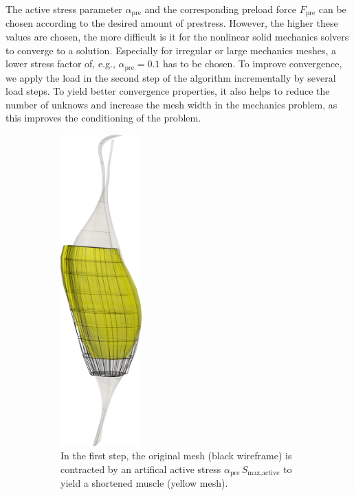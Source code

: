 The active stress parameter $\alpha_\text{pre}$ and the corresponding preload force $F_\text{pre}$ can be chosen according to the desired amount of prestress. However, the higher these values are chosen, the more difficult is it for the nonlinear solid mechanics solvers to converge to a solution. Especially for irregular or large mechanics meshes, a lower stress factor of, e.g., $\alpha_\text{pre}=0.1$ has to be chosen. To improve convergence, we apply the load in the second step of the algorithm incrementally by several load steps. To yield better convergence properties, it also helps to reduce the number of unknows and increase the mesh width in the mechanics problem, as this improves the conditioning of the problem. 
 
\begin{figure}
  \centering%
  \hfill
  \begin{subfigure}[t]{0.48\textwidth}%
    \centering%
    \includegraphics[height=12cm]{images/results/application/neuromuscular_prestretch_1.png}%
    \caption{In the first step, the original mesh (black wireframe) is contracted by an artifical active stress $\alpha_\text{pre}\,S_\text{max,active}$ to yield a shortened muscle (yellow mesh).}%
    \label{fig:neuromuscular_prestretch_1}%
  \end{subfigure}\hfill
  \begin{subfigure}[t]{0.48\textwidth}%
    \centering%

\end{subfigure}
\end{figure}
